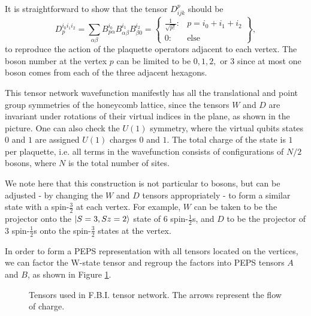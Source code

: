 It is straightforward to show that the tensor $D^p_{ijk}$ should be
$$
D_{p}^{i_0 i_1 i_2} = \sum\limits_{\alpha \beta} B^{i_0}_{p \alpha}B^{i_1}_{\alpha \beta} B^{i_2}_{\beta 0}  = \left\{ \begin{array}{lr}
													\frac{1}{\sqrt{p!}}  : & p =i_0+i_1+i_2  \\
													0  : & \text{else}
													\end{array}
											\right\},
$$
to reproduce the action of the plaquette operators adjacent to each vertex. The boson number at the vertex $p$ can be limited to be $0, 1, 2,$ or $3$ since at most one boson comes from each of the three adjacent hexagons.

This tensor network wavefunction manifestly has all the translational and point group symmetries of the honeycomb lattice, since the tensors $W$ and $D$ are invariant under rotations of their virtual indices in the plane, as shown in the picture. One can also check the $U(1)$ symmetry, where the virtual qubits states $0$ and $1$ are assigned $U(1)$ charges $0$ and $1$. The total charge of the state is $1$ per plaquette, i.e. all terms in the wavefunction consists of configurations of $N/2$ bosons, where $N$ is the total number of sites.

We note here that this construction is not particular to bosons, but can be adjusted - by changing the $W$ and $D$ tensors appropriately - to form a similar state with a spin-$\frac32$ at each vertex. For example, $W$ can be taken to be the projector onto the $\vert S=3, Sz=2 \rangle$ state of $6$ spin-$\frac12$s, and $D$ to be the projector of $3$ spin-$\frac12$s onto the spin-$\frac32$ states at the vertex. 


In order to form a PEPS representation with all tensors located on the vertices, we can factor the W-state tensor and regroup the factors into PEPS tensors $A$ and $B$, as shown in Figure \ref{fig:FBI_PEPS_full}.

\begin{figure}[H]
	\centering
	\quad
%
\caption{Tensors used in F.B.I. tensor network. The arrows represent the flow of charge.}
\label{fig:FBI_PEPS_full}
\end{figure}

